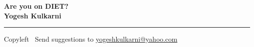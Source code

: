 
\graphicspath{{images/}}

\footnotesize


\begin{center}
\Large{\textbf{Are you on DIET?\\ Yogesh Kulkarni}}  
\end{center}

\begin{multicols}{2}

\end{multicols}

\rule{\linewidth}{0.25pt}
\scriptsize
Copyleft \textcopyleft\  Send suggestions to 
\href{http://www.yogeshkulkarni.com}{yogeshkulkarni@yahoo.com}


